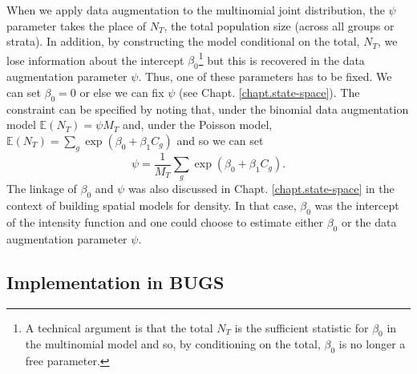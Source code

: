 When we apply data augmentation to the multinomial joint distribution,
the $\psi$ parameter takes the place of $N_{T}$, the total population
size (across all groups or strata). In addition, by constructing the
model conditional on the total, $N_{T}$, we lose information about the
intercept $\beta_{0}$\footnote{ A technical argument is that the total
  $N_{T}$ is the sufficient statistic for $\beta_{0}$ in the
  multinomial model and so, by conditioning on the total, $\beta_{0}$
  is no longer a free parameter.}  but this is recovered in the data
augmentation parameter $\psi$.  Thus, one of these parameters has to
be fixed. We can set $\beta_0 = 0$ or else we can fix $\psi$ (see
Chapt. \ref{chapt.state-space}).  The constraint can be specified by
noting that, under the binomial data augmentation model
$\mathbb{E}(N_{T}) = \psi M_{T}$ and, under the Poisson model,
$\mathbb{E}(N_{T}) = \sum_{g} \exp(\beta_{0} + \beta_{1} C_{g})$ and
so we can set
\[
 \psi = \frac{1}{M_{T}} \sum_{g} \exp(\beta_{0} + \beta_{1} C_{g}).
\]
The linkage of $\beta_{0}$ and $\psi$ was also discussed in
Chapt. \ref{chapt.state-space} in the context of building spatial
models for density. In that case, $\beta_0$ was the intercept of the
intensity function and one could choose to estimate either $\beta_0$
or the data augmentation parameter $\psi$.

\subsection{Implementation in BUGS}

